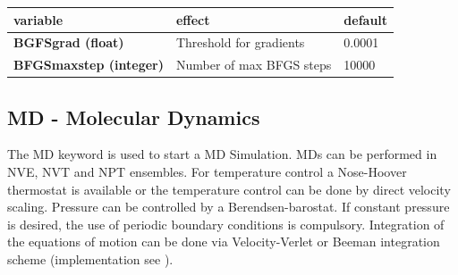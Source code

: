 \documentclass[10pt,a4paper]{article} %
\begin{document}
	\begin{tabularx}{\textwidth}{l|l|l}
		variable & effect & default \\
		\hline
		\textbf{BGFSgrad (float)} & Threshold for gradients & 0.0001 \\
		\textbf{BFGSmaxstep (integer)} & Number of max BFGS steps & 10000 \\
	\end{tabularx}

	\subsection{MD - Molecular Dynamics}
	The MD keyword is used to start a \acf{MD} Simulation\supercite{md_art}. \acp{MD} can be performed in NVE, NVT and NPT ensembles. For temperature control a Nose-Hoover thermostat\supercite{nose,hoover} is available or the temperature control can be done by direct velocity scaling. Pressure can be controlled by a Berendsen-barostat\supercite{berendsen}. If constant pressure is desired, the use of periodic boundary conditions is compulsory. Integration of the equations of motion can be done via Velocity-Verlet or Beeman\supercite{beeman} integration scheme (implementation see \cite{becker_development_2015}). 
\end{document}
